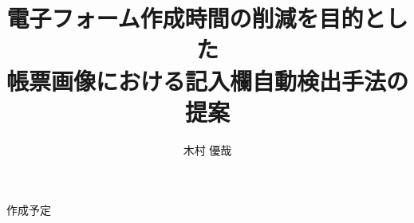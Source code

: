 \documentclass[uplatex, report, a4j, 10pt]{jsbook}
\title{電子フォーム作成時間の削減を目的とした\\帳票画像における記入欄自動検出手法の提案\\}
\author{木村 優哉}
\begin{document}
\maketitle


%
%
作成予定

%
%














\end{document}
